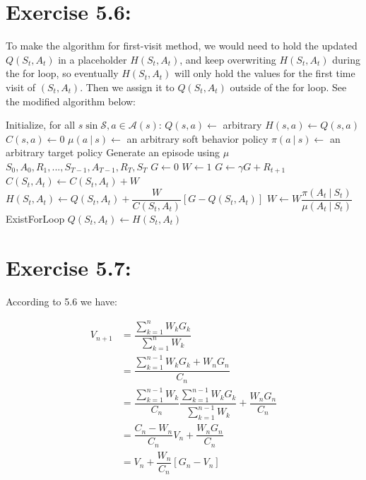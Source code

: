 \documentclass[10pt,letterpaper]{article}
\newcommand\given[1][]{\:#1\vert\:}
\begin{document}
\section*{Exercise 5.6: }
\label{5.6}

To make the algorithm for first-visit method, we would need to hold the updated $Q(S_t,A_t)$ in a placeholder $H(S_t,A_t)$, and keep overwriting $H(S_t,A_t)$ during the for loop, so eventually $H(S_t, A_t)$ will only hold the values for the first time visit of $(S_t, A_t)$. Then we assign it to $Q(S_t, A_t)$ outside of the for loop. See the modified algorithm below:

\begin{algorithmic}
\State Initialize, for all $s\sin \mathcal{S}, a\in \mathcal{A}(s)$:
\Indent
\State $Q(s,a) \gets$ arbitrary
\State $H(s,a) \gets Q(s,a)$
\State $C(s,a) \gets 0$ 
\State $\mu(a\given s) \gets$ an arbitrary soft behavior policy
\State $\pi(a\given s) \gets$ an arbitrary target policy
\EndIndent
\Repeat
\State Generate an episode using $\mu$
\Indent
\State $S_0,A_0,R_1,...,S_{T-1},A_{T-1},R_T,S_T$
\EndIndent
\State $G \gets 0$
\State $W \gets 1$
\State $G \gets \gamma G + R_{t+1}$
\State $C(S_t, A_t) \gets C(S_t, A_t) + W$
\State $H(S_t, A_t) \gets Q(S_t, A_t) + \dfrac{W}{C(S_t,A_t)}[G-Q(S_t, A_t)]$
\State $W \gets W\dfrac{\pi(A_t\given S_t)}{\mu(A_t\given S_t)}$
\State ExistForLoop
\EndIf
\EndFor
{}
\State $Q(S_t, A_t) \gets H(S_t, A_t)$
\EndFor
{}
\end{algorithmic}


\section*{Exercise 5.7: }
\label{5.7}

According to 5.6 we have:

\begin{align*}
V_{n+1}&= \dfrac{\sum_{k=1}^n W_k G_k}{\sum_{k=1}^n W_k} \\
&=\dfrac{\sum_{k=1}^{n-1}W_kG_k + W_nG_n}{C_n} \\
&=\dfrac{\sum_{k=1}^{n-1}W_k}{C_n}\dfrac{\sum_{k=1}^{n-1}W_kG_k}{\sum_{k=1}^{n-1}W_k} + \dfrac{W_nG_n}{C_n} \\
&=\dfrac{C_n-W_n}{C_n}V_n + \dfrac{W_nG_n}{C_n} \\
&=V_n + \dfrac{W_n}{C_n}\left[G_n-V_n\right]
\end{align*}
\end{document}
